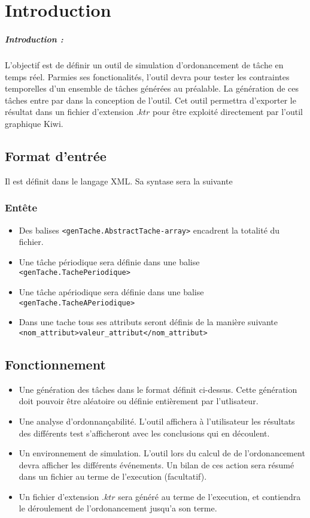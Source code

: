 \chapter{Introduction}
\paragraph{Introduction :}
 L'objectif est de définir un outil de simulation  d'ordonancement de tâche en temps réel. Parmies ses fonctionalités, l'outil devra pour tester les contraintes temporelles d'un ensemble de tâches générées au préalable. La génération de ces tâches entre par dans la conception de l'outil. Cet outil permettra d'exporter le résultat dans un fichier  d'extension $.ktr$ pour être exploité directement par l'outil graphique Kiwi.
 
\section{Format d'entrée}
Il est définit dans le langage XML. Sa syntase sera la suivante
\subsection{Entête}
\begin{itemize}
\item

Des balises \verb+<genTache.AbstractTache-array>+ encadrent la totalité du fichier.
\item
Une tâche périodique sera définie dans une balise  \verb+<genTache.TachePeriodique>+ 
\item
Une tâche apériodique sera définie dans une balise  \verb+<genTache.TacheAPeriodique>+ 
\item
Dans une tache tous ses attributs seront définis de la manière suivante \verb+<nom_attribut>valeur_attribut</nom_attribut>+
\end{itemize}

\section{Fonctionnement}
\begin{itemize}
\item
Une génération des tâches dans le format définit ci-dessus. Cette génération doit pouvoir être aléatoire ou définie entièrement par l'utlisateur.
\item
Une analyse d'ordonnançabilité. L'outil affichera à l'utilisateur les résultats des différents test  s'afficheront avec les conclusions qui en découlent.
\item
Un environnement de simulation. L'outil lors du calcul de de l'ordonancement devra afficher les différents événements. Un bilan de ces action sera résumé dans un fichier au terme de l'execution (facultatif).
\item
Un fichier d'extension $.ktr$ sera généré au terme de l'execution, et contiendra le déroulement de l'ordonancement jusqu'a son terme.
\end{itemize}

